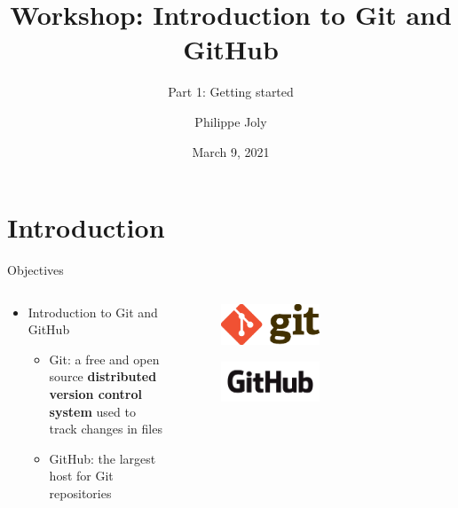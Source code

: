 \documentclass[handout]{beamer}
\title[Git/GitHub Workshop: Part 1]{Workshop: Introduction to Git and GitHub}
\subtitle{Part 1: Getting started}
\author[P. Joly]{Philippe Joly}
\institute[FU-Berlin]{Freie Universität Berlin}
\date{March 9, 2021}
\begin{document}
\begin{frame}
\titlepage
\end{frame}


%
%


\section{Introduction}

\begin{frame}{Objectives}
  \begin{columns}
  
    \begin{column}{0.5\textwidth}
    	\begin{itemize}
			  \item Introduction to Git and GitHub
			  \begin{itemize}
				  \item Git: a free and open source \textbf{distributed version control system} used to track changes in files
				  \item GitHub: the largest host for Git repositories
			  \end{itemize}
		  \end{itemize}
		\end{column}
		
    \begin{column}{0.5\textwidth}
      \begin{figure}
	      \includegraphics[width=0.5\textwidth]{figures/git_logo.eps}
	      \caption{}
      \end{figure}
      \begin{figure}
	      \includegraphics[width=0.5\textwidth]{figures/github_logo.png}
	      \caption{}
      \end{figure}
    \end{column}
  \end{columns}
\end{frame}
\end{document}

